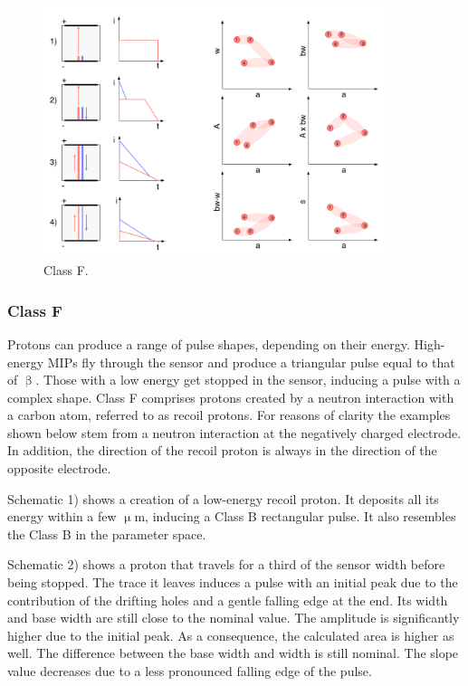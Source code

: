 \clearpage

\begin{figure}[!t]
\centering
\includegraphics[width=0.9\textwidth]{05_current_monitoring/plots/classF}
\caption{Class F.}
\label{fig:classf}
\end{figure}

\clearpage
\subsubsection{Class F}
\label{sec:classf}

Protons can produce a range of pulse shapes, depending on their energy. High-energy MIPs fly through the sensor and produce a triangular pulse equal to that of $\upbeta$. Those with a low energy get stopped in the sensor, inducing a pulse with a complex shape. Class F comprises protons created by a neutron interaction with a carbon atom, referred to as recoil protons. For reasons of clarity the examples shown below stem from a neutron interaction at the negatively charged electrode. In addition, the direction of the recoil proton is always in the direction of the opposite electrode.

Schematic 1) shows a creation of a low-energy recoil proton. It deposits all its energy within a few $\upmu$m, inducing a Class B rectangular pulse. It also resembles the Class B in the parameter space.

Schematic 2) shows a proton that travels for a third of the sensor width before being stopped. The trace it leaves induces a pulse with an initial peak due to the contribution of the drifting holes and a gentle falling edge at the end. Its width and base width are still close to the nominal value. The amplitude is significantly higher due to the initial peak. As a consequence, the calculated area is higher as well. The difference between the base width and width is still nominal. The slope value decreases due to a less pronounced falling edge of the pulse.

